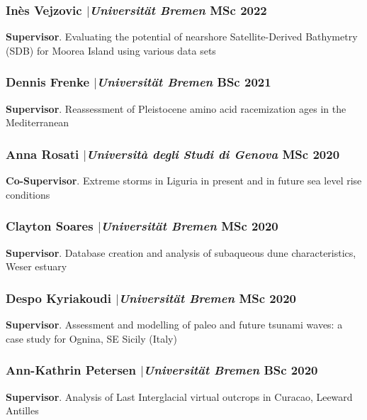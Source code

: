 \documentclass[11pt]{article}
\begin{document}
\smallskip

\subsubsection{Inès Vejzovic $|${\normalfont\textit{Universität Bremen}} \hfill MSc 2022}
{\footnotesize 
\textbf{Supervisor}. Evaluating the potential of nearshore Satellite-Derived Bathymetry (SDB) for Moorea Island using various data sets}

\smallskip

\subsubsection{Dennis Frenke $|${\normalfont\textit{Universität Bremen}} \hfill BSc 2021}
{\footnotesize 
\textbf{Supervisor}. Reassessment of Pleistocene amino acid racemization ages in the Mediterranean}

\smallskip

\subsubsection{Anna Rosati $|${\normalfont\textit{Università degli Studi di Genova}} \hfill MSc 2020}
{\footnotesize 
\textbf{Co-Supervisor}. Extreme storms in Liguria in present and in future sea level rise conditions}

\smallskip

\subsubsection{Clayton Soares $|${\normalfont\textit{Universität Bremen}} \hfill MSc 2020}
{\footnotesize 
\textbf{Supervisor}. Database creation and analysis of subaqueous dune characteristics, Weser estuary}

\smallskip

\subsubsection{Despo Kyriakoudi $|${\normalfont\textit{Universität Bremen}} \hfill MSc 2020}
{\footnotesize 
\textbf{Supervisor}. Assessment and modelling of paleo and future tsunami waves: a case study for Ognina, SE Sicily (Italy)}

\smallskip

\subsubsection{Ann-Kathrin Petersen $|${\normalfont\textit{Universität Bremen}} \hfill BSc 2020}
{\footnotesize 
\textbf{Supervisor}. Analysis of Last Interglacial virtual outcrops in Curacao, Leeward Antilles}
\end{document}
